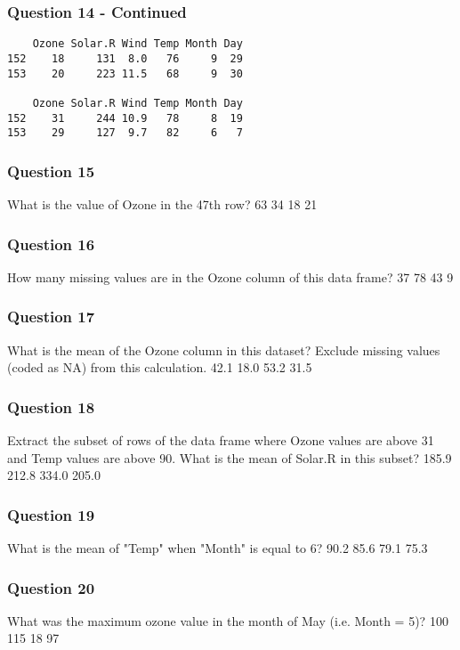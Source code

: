 \begin{frame}
\frametitle{Question 14 - Continued}
\Large
\begin{verbatim} 
    Ozone Solar.R Wind Temp Month Day
152    18     131  8.0   76     9  29
153    20     223 11.5   68     9  30
 
    Ozone Solar.R Wind Temp Month Day
152    31     244 10.9   78     8  19
153    29     127  9.7   82     6   7
\end{verbatim}
\end{frame}
\begin{frame}
\frametitle{Question 15}
\Large
What is the value of Ozone in the 47th row?
63
34
18
21
\end{frame}
\begin{frame}
\frametitle{Question 16}
\Large
How many missing values are in the Ozone column of this data frame?
37
78
43
9
\end{frame}
\begin{frame}
\frametitle{Question 17}
\Large
What is the mean of the Ozone column in this dataset? Exclude missing values (coded as NA) from this calculation.
42.1
18.0
53.2
31.5
\end{frame}
\begin{frame}
\frametitle{Question 18}
\Large
Extract the subset of rows of the data frame where Ozone values are above 31 and Temp values are above 90. What is the mean of Solar.R in this subset?
185.9
212.8
334.0
205.0
\end{frame}
\begin{frame}
\frametitle{Question 19}
\Large
What is the mean of "Temp" when "Month" is equal to 6?
90.2
85.6
79.1
75.3
\end{frame}
\begin{frame}
\frametitle{Question 20}
\Large
What was the maximum ozone value in the month of May (i.e. Month = 5)?
100
115
18
97
\end{frame}


